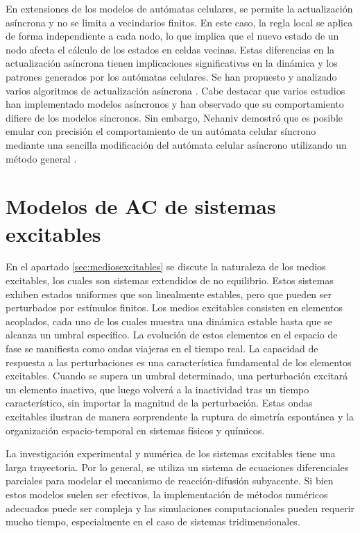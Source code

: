 En extensiones de los modelos de autómatas celulares, se permite la actualización asíncrona y no se limita a vecindarios finitos. En este caso, la regla local se aplica de forma independiente a cada nodo, lo que implica que el nuevo estado de un nodo afecta el cálculo de los estados en celdas vecinas. Estas diferencias en la actualización asíncrona tienen implicaciones significativas en la dinámica y los patrones generados por los autómatas celulares. Se han propuesto y analizado varios algoritmos de actualización asíncrona \cite{schonfisch_synchronous_1999,cornforth_ordered_2005,fates_guided_2013}. Cabe destacar que varios estudios han implementado modelos asíncronos y han observado que su comportamiento difiere de los modelos síncronos. Sin embargo, Nehaniv demostró que es posible emular con precisión el comportamiento de un autómata celular síncrono mediante una sencilla modificación del autómata celular asíncrono utilizando un método general \cite{nehaniv_asynchronous_2011}.



\section{Modelos de AC de sistemas excitables}\label{sec:medios_excitables}

En el apartado \cref{sec:mediosexcitables}  se discute la naturaleza de los medios excitables, los cuales son sistemas extendidos de no equilibrio. Estos sistemas exhiben estados uniformes que son linealmente estables, pero que pueden ser perturbados por estímulos finitos. Los medios excitables consisten en elementos acoplados, cada uno de los cuales muestra una dinámica estable hasta que se alcanza un umbral específico. La evolución de estos elementos en el espacio de fase se manifiesta como ondas viajeras en el tiempo real. La capacidad de respuesta a las perturbaciones es una característica fundamental de los elementos excitables. Cuando se supera un umbral determinado, una perturbación excitará un elemento inactivo, que luego volverá a la inactividad tras un tiempo característico, sin importar la magnitud de la perturbación. Estas ondas excitables ilustran de manera sorprendente la ruptura de simetría espontánea y la organización espacio-temporal en sistemas físicos y químicos.

La investigación experimental y numérica de los sistemas excitables tiene una larga trayectoria. Por lo general, se utiliza un sistema de ecuaciones diferenciales parciales para modelar el mecanismo de reacción-difusión subyacente. Si bien estos modelos suelen ser efectivos, la implementación de métodos numéricos adecuados puede ser compleja y las simulaciones computacionales pueden requerir mucho tiempo, especialmente en el caso de sistemas tridimensionales.

